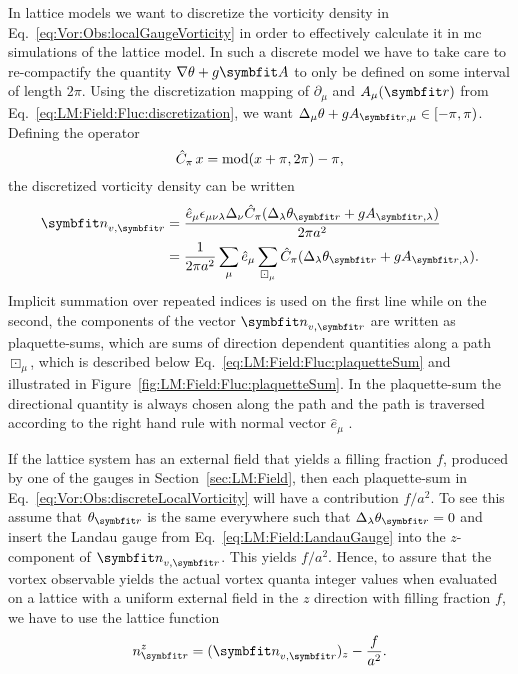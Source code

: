 In lattice models we want to discretize the vorticity density in Eq.~\eqref{eq:Vor:Obs:localGaugeVorticity} in order to effectively calculate it in \ac{mc} simulations
of the lattice model. In such a discrete model we have to take care to re-compactify the quantity $\nabla\theta+g\v{A}$ to only be defined on some interval of length $2\pi$.
Using the discretization mapping of $\partial_\mu$ and $A_\mu(\v{r})$ from Eq.~\eqref{eq:LM:Field:Fluc:discretization}, we want
$\Delta_\mu\theta + gA_{\v{r},\mu}\in[-\pi,\pi)$. Defining the operator
\begin{equation}
    \label{eq:Vor:Obs:moduloOperator}
    \hat{C}_\pi\, x = \operatorname{mod}(x+\pi,2\pi)-\pi,
\end{equation}
the discretized vorticity density can be written
\begin{equation}
    \label{eq:Vor:Obs:discreteLocalVorticity}
    \begin{split}
        \v{n}_{v,\v{r}} &= \frac{\hat{e}_\mu\epsilon_{\mu\nu\lambda}\Delta_\nu\hat{C}_\pi(\Delta_\lambda\theta_\v{r} + gA_{\v{r},\lambda})}{2\pi a^2}\\
        &= \frac{1}{2\pi a^2}\sum_\mu \hat{e}_\mu\sum_{\boxdot_\mu}\hat{C}_\pi(\Delta_\lambda\theta_\v{r} + gA_{\v{r},\lambda}).
    \end{split}
\end{equation}
Implicit summation over repeated indices is used on the first line while on the second, the components of the vector $\v{n}_{v,\v{r}}$ are written as plaquette-sums,
which are sums of direction dependent quantities along a path $\boxdot_\mu$, which is described below Eq.~\eqref{eq:LM:Field:Fluc:plaquetteSum} and illustrated in
Figure~\ref{fig:LM:Field:Fluc:plaquetteSum}. In the plaquette-sum the directional quantity is always chosen along the path and the path is traversed according to
the right hand rule with normal vector $\hat{e}_\mu$ \cite{Kragset08,shimizu12}.

If the lattice system has an external field that yields a filling fraction $f$, \eg produced by one of the gauges in Section~\ref{sec:LM:Field}, then each plaquette-sum
in Eq.~\eqref{eq:Vor:Obs:discreteLocalVorticity} will have a contribution $f/a^2$. To see this assume \eg that $\theta_\v{r}$ is the same everywhere such that
$\Delta_\lambda\theta_\v{r}=0$ and insert the Landau gauge from Eq.~\eqref{eq:LM:Field:LandauGauge} into the $z$-component of $\v{n}_{v,\v{r}}$. This yields $f/a^2$.
Hence, to assure that the vortex observable yields the actual vortex quanta integer values when evaluated on a lattice with a uniform external field in the $z$
direction with filling fraction $f$, we have to use the lattice function
\begin{equation}
    \label{eq:Vor:Obs:discreteLocalVorticity:fieldSubtracted}
    n^z_\v{r} = (\v{n}_{v,\v{r}})_z - \frac{f}{a^2}.
\end{equation}

